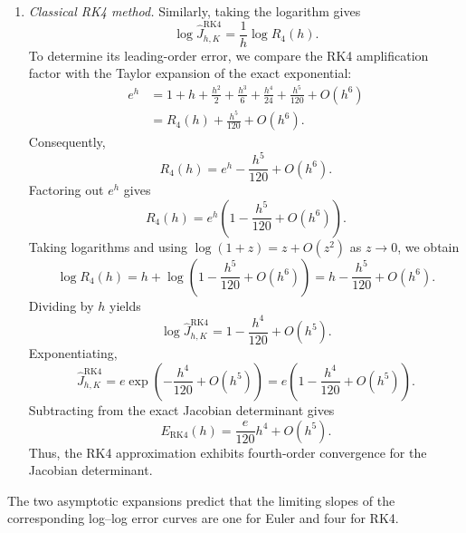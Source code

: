 \documentclass[12pt,a4paper,oneside]{book}
\begin{document}
\begin{solution}
\begin{enumerate}
    \item \textit{Classical RK4 method.}
        Similarly, taking the logarithm gives
        \begin{equation*}
            \log\widehat J_{h,K}^{\mathrm{RK4}} = \frac{1}{h}\log R_4(h).
        \end{equation*}
        To determine its leading-order error, we compare the RK4 amplification factor with the Taylor expansion of the exact
        exponential:
        \begin{equation*}
            \begin{aligned}
                e^h &=1+h+\frac{h^2}{2}+\frac{h^3}{6} + \frac{h^4}{24}+\frac{h^5}{120} + O(h^6)\\
                &=R_4(h)+\frac{h^5}{120}+O(h^6).
            \end{aligned}
        \end{equation*}
        Consequently,
        \begin{equation*}
            R_4(h) = e^h-\frac{h^5}{120}+O(h^6).
        \end{equation*}
        Factoring out $e^h$ gives
        \begin{equation*}
            R_4(h) =  e^h
                \left(
                    1-\frac{h^5}{120}+O(h^6)
                \right).
        \end{equation*}
        Taking logarithms and using $\log(1+z)=z+O(z^2)$ as $z\to0$, we obtain
        \begin{equation*}
            \log R_4(h) = h+\log\left( 1-\frac{h^5}{120}+O(h^6)\right) = h-\frac{h^5}{120}+O(h^6).
        \end{equation*}
        Dividing by $h$ yields
        \begin{equation*}
            \log\widehat J_{h,K}^{\mathrm{RK4}} = 1-\frac{h^4}{120}+O(h^5).
        \end{equation*}
        Exponentiating,
        \begin{equation*}
            \widehat J_{h,K}^{\mathrm{RK4}}
                = e\exp\left(-\frac{h^4}{120}+O(h^5)\right)
                = e\left( 1-\frac{h^4}{120}+O(h^5)\right).
        \end{equation*}
        Subtracting from the exact Jacobian determinant gives
        \begin{equation*}
            E_{\mathrm{RK4}}(h) = \frac e{120}h^4+O(h^5).
        \end{equation*}
        Thus, the RK4 approximation exhibits fourth-order convergence for the Jacobian determinant.
\end{enumerate}
The two asymptotic expansions predict that the limiting slopes of the corresponding log--log error curves are one for Euler
and four for RK4.


\end{solution}
\end{document}
